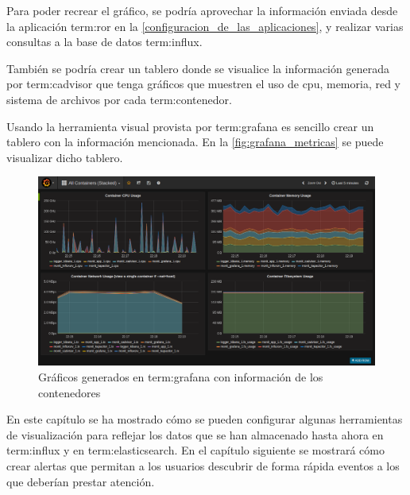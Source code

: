 Para poder recrear el gráfico, se podría aprovechar la información enviada desde
la aplicación \gls{term:ror} en la \autoref{configuracion_de_las_aplicaciones},
y realizar varias consultas a la base de datos \gls{term:influx}.

También se podría crear un tablero donde se visualice la información generada
por \gls{term:cadvisor} que tenga gráficos que muestren el uso de
cpu, memoria, red y sistema de archivos por cada \gls{term:contenedor}.

Usando la herramienta visual provista por \gls{term:grafana} es sencillo crear
un tablero con la información mencionada. En la \autoref{fig:grafana_metricas}
se puede visualizar dicho tablero.

\begin{figure}
  \includegraphics[width=\linewidth]{src/images/05-capitulo-5/grafana_metricas.png}
  \caption{Gráficos generados en \gls{term:grafana} con información de los contenedores}
  \label{fig:grafana_metricas}
\end{figure}

En este capítulo se ha mostrado cómo se pueden configurar algunas herramientas
de visualización para reflejar los datos que se han almacenado hasta ahora en
\gls{term:influx} y en \gls{term:elasticsearch}. En el capítulo siguiente
se mostrará cómo crear alertas que permitan a los usuarios descubrir de forma
rápida eventos a los que deberían prestar atención.
